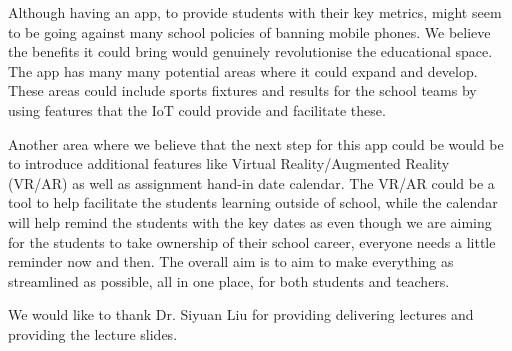 \documentclass[sigchi]{acmart}
\begin{document}
Although having an app, to provide students with their key metrics, might seem to be going against many school policies of banning mobile phones. We believe the benefits it could bring would genuinely revolutionise the educational space. The app has many many potential areas where it could expand and develop. These areas could include sports fixtures and results for the school teams by using features that the IoT could provide and facilitate these.  

Another area where we believe that the next step for this app could be would be to introduce additional features like Virtual Reality/Augmented Reality (VR/AR) as well as assignment hand-in date calendar. The VR/AR could be a tool to help facilitate the students learning outside of school, while the calendar will help remind the students with the key dates as even though we are aiming for the students to take ownership of their school career, everyone needs a little reminder now and then. The overall aim is to aim to make everything as streamlined as possible, all in one place, for both students and teachers.
\begin{acks}
We would like to thank Dr. Siyuan Liu for providing delivering lectures and providing the lecture slides.
\end{acks}



\end{document}
